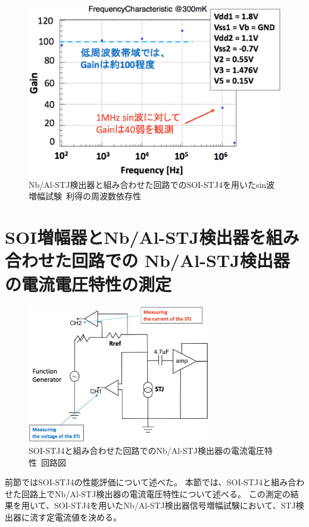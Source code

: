 			\begin{figure}[htbp]
				\begin{center}
					\includegraphics[width=12.0cm]{./Chapter/Chapter4/Picture/SOISTJ4wSTJ_frequency.eps}
					\caption{Nb/Al-STJ検出器と組み合わせた回路でのSOI-STJ4を用いたsin波増幅試験\ 利得の周波数依存性}
					\label{fig:SOISTJ4wSTJ_frequency}
				\end{center}
			\end{figure}
			\clearpage
			
	\section{SOI増幅器とNb/Al-STJ検出器を組み合わせた回路での \newline Nb/Al-STJ検出器の電流電圧特性の測定}
		\begin{figure}[htbp]
			\begin{center}
				\includegraphics[width=8.0cm]{./Chapter/Chapter4/Picture/NbAlSTJwSOI_IV_circuit.eps}
				\caption{SOI-STJ4と組み合わせた回路でのNb/Al-STJ検出器の電流電圧特性\ 回路図}
				\label{fig:NbAlSTJwSOI_IV_circuit}
			\end{center}
		\end{figure}
		前節ではSOI-STJ4の性能評価について述べた。
		本節では、SOI-STJ4と組み合わせた回路上でNb/Al-STJ検出器の電流電圧特性について述べる。
		この測定の結果を用いて、SOI-STJ4を用いたNb/Al-STJ検出器信号増幅試験において、STJ検出器に流す定電流値を決める。
		
